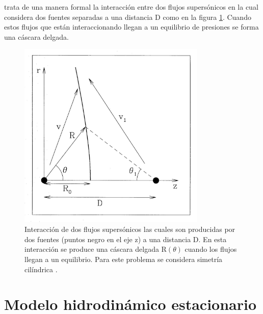 \documentclass{book}
\begin{document}
\cite{Canto:1996} trata de una manera formal la interacción entre dos flujos supersónicos en la cual considera dos fuentes separadas a una distancia D como en la figura \ref{fig:Canto1}. Cuando estos flujos que están interaccionando llegan a un equilibrio de presiones se forma una cáscara delgada.

\begin{figure}[h]
    \centering    \includegraphics[width=0.8\textwidth]{images Chapter 2/C2_Canto.jpg}
    \caption{Interacción de dos flujos supersónicos las cuales son producidas por dos fuentes (puntos negro en el eje z) a una distancia D. En esta interacción se produce una cáscara delgada R$(\theta)$ cuando los flujos llegan a un equilibrio. Para este problema se considera simetría cilíndrica \citep{Canto:1996}.}
    \label{fig:Canto1}
\end{figure}


\section{Modelo hidrodinámico estacionario}
\end{document}
